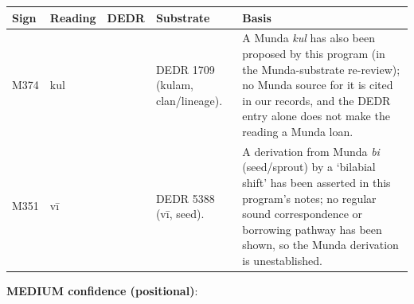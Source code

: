 \documentclass[11pt]{article}
\newcounter{none} %
\begin{document}
{\def\LTcaptype{none} %
\begin{longtable}[]{@{}
  >{\raggedright\arraybackslash}p{}
  >{\raggedright\arraybackslash}p{}
  >{\raggedright\arraybackslash}p{}
  >{\raggedright\arraybackslash}p{}
  >{\raggedright\arraybackslash}p{}@{}}
\toprule\noalign{}
\begin{minipage}[b]{\linewidth}\raggedright
Sign
\end{minipage} & \begin{minipage}[b]{\linewidth}\raggedright
Reading
\end{minipage} & \begin{minipage}[b]{\linewidth}\raggedright
DEDR
\end{minipage} & \begin{minipage}[b]{\linewidth}\raggedright
Substrate
\end{minipage} & \begin{minipage}[b]{\linewidth}\raggedright
Basis
\end{minipage} \\
\midrule\noalign{}
\endhead
\bottomrule\noalign{}
\endlastfoot
M374 & kul & 1709 & DEDR 1709 (kulam, clan/lineage). & A Munda \emph{kul} has also been proposed by this program (in the Munda-substrate re-review); no Munda source for it is cited in our records, and the DEDR entry alone does not make the reading a Munda loan. \\
M351 & vī & 5388 & DEDR 5388 (vī, seed). & A derivation from Munda \emph{bi} (seed/sprout) by a `bilabial shift' has been asserted in this program's notes; no regular sound correspondence or borrowing pathway has been shown, so the Munda derivation is unestablished. \\
\end{longtable}
}

\textbf{MEDIUM confidence (positional)}:
\end{document}
